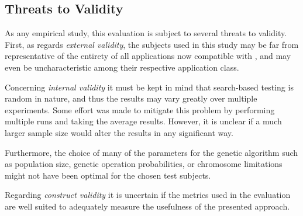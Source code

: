 
\subsection{Threats to Validity}
As any empirical study, this evaluation is subject to several threats to validity.
First, as regards \emph{external validity}, the subjects used in this study may be far from representative of
the entirety of all applications now compatible with \xmlmate, and may even be uncharacteristic among their
respective application class.

Concerning \emph{internal validity} it must be kept in mind that search-based testing is random in nature, and
thus the results may vary greatly over multiple experiments. Some effort was made to mitigate this problem by
performing multiple runs and taking the average results. However, it is unclear if a much larger sample size
would alter the results in any significant way.

Furthermore, the choice of many of the parameters for the genetic algorithm such as population size,
genetic operation probabilities, or chromosome limitations might not have been optimal for the chosen test
subjects.

Regarding \emph{construct validity} it is uncertain if the metrics used in the evaluation are well suited
to adequately measure the usefulness of the presented approach.
 
